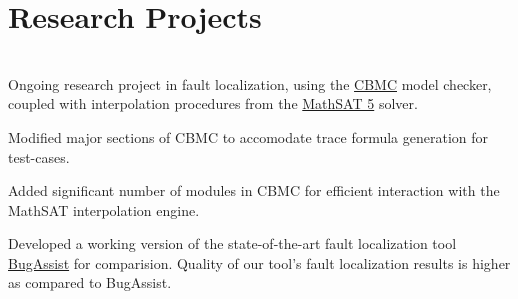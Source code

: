 \documentclass[letterpaper]{Formatting}
\begin{document}
\begin{minipage}[t]{0.66\textwidth}
\section{Research Projects}
\\\vspace{1.5ex}
\vspace{0.5em}
Ongoing research project in fault localization, using the \href{http://www.cprover.org/cbmc/}{CBMC} model checker, coupled with interpolation procedures from the \href{http://mathsat.fbk.eu/}{MathSAT 5} solver.\vspace{2.5ex}
\footnotesize {
\begin{tightitemize}
\item Modified major sections of CBMC to accomodate trace formula generation for test-cases. 
\item Added significant number of modules in CBMC for efficient interaction with the MathSAT interpolation engine.
\item Developed a working version of the state-of-the-art fault localization tool \href{http://bugassist.mpi-sws.org/}{BugAssist} for comparision. Quality of our tool's fault localization results is higher as compared to BugAssist.
\end{tightitemize}
}
\sectionspace %
\vspace{2ex}
\\\vspace{1.1ex}
\vspace{0.5ex}

\end{minipage}
\end{document}
